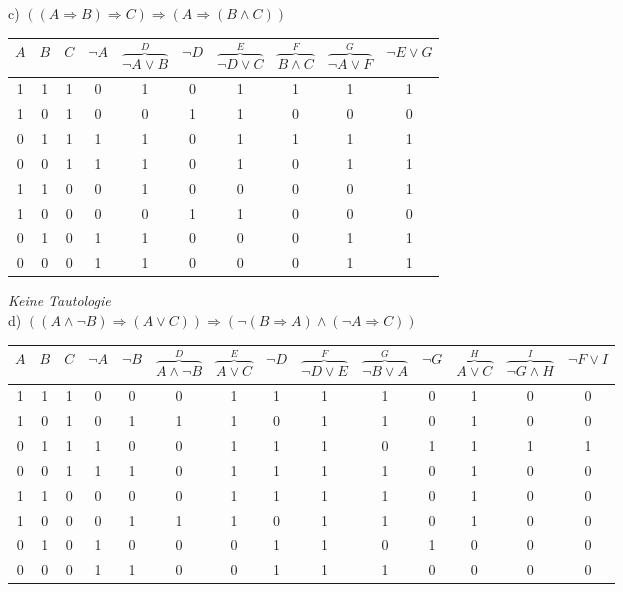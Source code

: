 \newpage

c) $((A \Rightarrow B) \Rightarrow C) \Rightarrow (A \Rightarrow (B \land C))$\\

\begin{table}[h]
\centering
\begin{tabular}{c|c|c|c|c|c|c|c|c|c}
$A$ & $B$ & $C$ & $\lnot A$ & $\overbrace{\lnot A \lor B}^{D}$ & $\lnot D$ & $\overbrace{\lnot D \lor C}^{E}$ & $\overbrace{B \land C}^{F}$ & $\overbrace{\lnot A \lor F}^{G}$ & $\lnot E \lor G$\\
\hline
1 & 1 & 1 & 0 & 1 & 0 & 1 & 1 & 1 & 1\\
1 & 0 & 1 & 0 & 0 & 1 & 1 & 0 & 0 & 0\\
0 & 1 & 1 & 1 & 1 & 0 & 1 & 1 & 1 & 1\\
0 & 0 & 1 & 1 & 1 & 0 & 1 & 0 & 1 & 1\\
1 & 1 & 0 & 0 & 1 & 0 & 0 & 0 & 0 & 1\\
1 & 0 & 0 & 0 & 0 & 1 & 1 & 0 & 0 & 0\\
0 & 1 & 0 & 1 & 1 & 0 & 0 & 0 & 1 & 1\\
0 & 0 & 0 & 1 & 1 & 0 & 0 & 0 & 1 & 1\\
\end{tabular}
\end{table}

\textit{Keine Tautologie}\\

d) $((A \land \lnot B) \Rightarrow (A \lor C)) \Rightarrow (\lnot (B \Rightarrow A) \land (\lnot A \Rightarrow C))$\\

\begin{table}[h]
\scriptsize
\centering
\begin{tabular}{c|c|c|c|c|c|c|c|c|c|c|c|c|c}
$A$ & $B$ & $C$ & $\lnot A$ & $\lnot B$ & $\overbrace{A \land \lnot B}^{D}$ & $\overbrace{A \lor C}^{E}$ & $\lnot D$ & $\overbrace{\lnot D \lor E}^{F}$ & $\overbrace{\lnot B \lor A}^{G}$ & $\lnot G$ & $\overbrace{A \lor C}^{H}$ & $\overbrace{\lnot G \land H}^{I}$ & $\lnot F \lor I$\\
\hline
1 & 1 & 1 & 0 & 0 & 0 & 1 & 1 & 1 & 1 & 0 & 1 & 0 & 0\\
1 & 0 & 1 & 0 & 1 & 1 & 1 & 0 & 1 & 1 & 0 & 1 & 0 & 0\\
0 & 1 & 1 & 1 & 0 & 0 & 1 & 1 & 1 & 0 & 1 & 1 & 1 & 1\\
0 & 0 & 1 & 1 & 1 & 0 & 1 & 1 & 1 & 1 & 0 & 1 & 0 & 0\\
1 & 1 & 0 & 0 & 0 & 0 & 1 & 1 & 1 & 1 & 0 & 1 & 0 & 0\\
1 & 0 & 0 & 0 & 1 & 1 & 1 & 0 & 1 & 1 & 0 & 1 & 0 & 0\\
0 & 1 & 0 & 1 & 0 & 0 & 0 & 1 & 1 & 0 & 1 & 0 & 0 & 0\\
0 & 0 & 0 & 1 & 1 & 0 & 0 & 1 & 1 & 1 & 0 & 0 & 0 & 0\\
\end{tabular}
\end{table}

